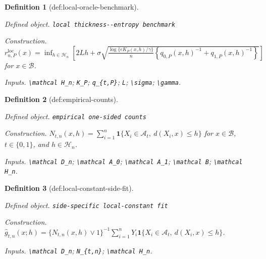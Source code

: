 \documentclass{article}
\newtheorem{definition}{Definition}
\begin{document}
\begin{definition}[def:local-oracle-benchmark]\label{def:local-oracle-benchmark}
\par\smallskip\noindent\emph{Defined object.} \texttt{local thickness-\allowbreak{}-\allowbreak{}entropy benchmark}
\par\smallskip\noindent\emph{Construction.} \(r_{n,P}^{\mathrm{loc}}(x)=\inf_{h\in\mathcal H_n}\left[2Lh+\sigma\sqrt{\frac{\log\{eK_P(x,h)/\gamma\}}{n}\left\{q_{0,P}(x,h)^{-1}+q_{1,P}(x,h)^{-1}\right\}}\right]\) for \(x\in\mathcal B\).
\par\smallskip\noindent\emph{Inputs.} \texttt{\textbackslash{}\allowbreak{}mathcal H\_\allowbreak{}n}; \texttt{K\_\allowbreak{}P}; \texttt{q\_\allowbreak{}\{t,\allowbreak{}P\}\allowbreak{}}; \texttt{L}; \texttt{\textbackslash{}\allowbreak{}sigma}; \texttt{\textbackslash{}\allowbreak{}gamma}.
\end{definition}

\begin{definition}[def:empirical-counts]\label{def:empirical-counts}
\par\smallskip\noindent\emph{Defined object.} \texttt{empirical one-\allowbreak{}sided counts}
\par\smallskip\noindent\emph{Construction.} \(N_{t,n}(x,h)=\sum_{i=1}^n\mathbf 1\{X_i\in\mathcal A_t,\ d(X_i,x)\le h\}\) for \(x\in\mathcal B\), \(t\in\{0,1\}\), and \(h\in\mathcal H_n\).
\par\smallskip\noindent\emph{Inputs.} \texttt{\textbackslash{}\allowbreak{}mathcal D\_\allowbreak{}n}; \texttt{\textbackslash{}\allowbreak{}mathcal A\_\allowbreak{}0}; \texttt{\textbackslash{}\allowbreak{}mathcal A\_\allowbreak{}1}; \texttt{\textbackslash{}\allowbreak{}mathcal B}; \texttt{\textbackslash{}\allowbreak{}mathcal H\_\allowbreak{}n}.
\end{definition}

\begin{definition}[def:local-constant-side-fit]\label{def:local-constant-side-fit}
\par\smallskip\noindent\emph{Defined object.} \texttt{side-\allowbreak{}specific local-\allowbreak{}constant fit}
\par\smallskip\noindent\emph{Construction.} \(\widehat g_{t,n}(x;h)=\{N_{t,n}(x,h)\vee1\}^{-1}\sum_{i=1}^nY_i\mathbf 1\{X_i\in\mathcal A_t,\ d(X_i,x)\le h\}\).
\par\smallskip\noindent\emph{Inputs.} \texttt{\textbackslash{}\allowbreak{}mathcal D\_\allowbreak{}n}; \texttt{N\_\allowbreak{}\{t,\allowbreak{}n\}\allowbreak{}}; \texttt{\textbackslash{}\allowbreak{}mathcal H\_\allowbreak{}n}.
\end{definition}
\end{document}
